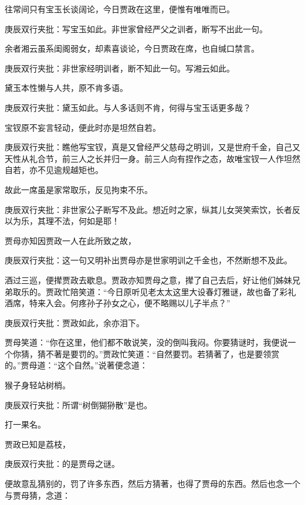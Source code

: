 \begin{parag}
    往常间只有宝玉长谈阔论，今日贾政在这里，便惟有唯唯而已。\begin{note}庚辰双行夹批：写宝玉如此。非世家曾经严父之训者，断写不出此一句。\end{note}余者湘云虽系闺阁弱女，却素喜谈论，今日贾政在席，也自缄口禁言。\begin{note}庚辰双行夹批：非世家经明训者，断不知此一句。写湘云如此。\end{note}黛玉本性懒与人共，原不肯多语。\begin{note}庚辰双行夹批：黛玉如此。与人多话则不肯，何得与宝玉话更多哉？\end{note}宝钗原不妄言轻动，便此时亦是坦然自若。\begin{note}庚辰双行夹批：瞧他写宝钗，真是又曾经严父慈母之明训，又是世府千金，自己又天性从礼合节，前三人之长并归一身。前三人向有捏作之态，故唯宝钗一人作坦然自若，亦不见逾规越矩也。\end{note}故此一席虽是家常取乐，反见拘束不乐。\begin{note}庚辰双行夹批：非世家公子断写不及此。想近时之家，纵其儿女哭笑索饮，长者反以为乐，其理不法，何如是耶！\end{note}贾母亦知因贾政一人在此所致之故，\begin{note}庚辰双行夹批：这一句又明补出贾母亦是世家明训之千金也，不然断想不及此。\end{note}酒过三巡，便撵贾政去歇息。贾政亦知贾母之意，撵了自己去后，好让他们姊妹兄弟取乐的。贾政忙陪笑道：“今日原听见老太太这里大设春灯雅谜，故也备了彩礼酒席，特来入会。何疼孙子孙女之心，便不略赐以儿子半点？”\begin{note}庚辰双行夹批：贾政如此，余亦泪下。\end{note}贾母笑道：“你在这里，他们都不敢说笑，没的倒叫我闷。你要猜谜时，我便说一个你猜，猜不著是要罚的。”贾政忙笑道：“自然要罚。若猜著了，也是要领赏的。”贾母道：“这个自然。”说著便念道：
\end{parag}


\begin{parag}
    猴子身轻站树梢。\begin{note}庚辰双行夹批：所谓“树倒猢狲散”是也。\end{note}打一果名。
\end{parag}


\begin{parag}
    贾政已知是荔枝，\begin{note}庚辰双行夹批：的是贾母之谜。\end{note}便故意乱猜别的，罚了许多东西，然后方猜著，也得了贾母的东西。然后也念一个与贾母猜，念道：
\end{parag}


